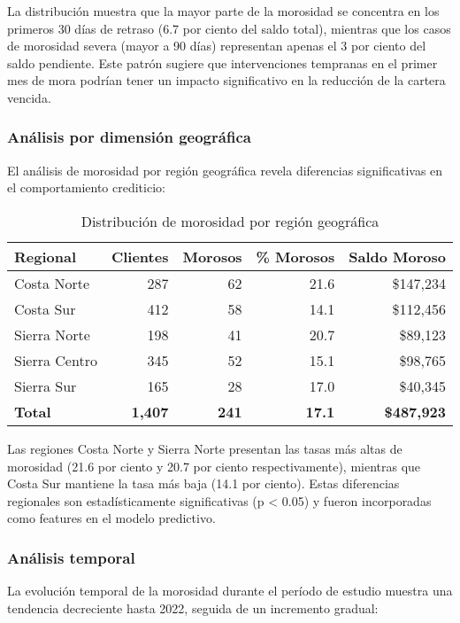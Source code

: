 La distribución muestra que la mayor parte de la morosidad se concentra en los primeros 30 días de retraso (6.7 por ciento del saldo total), mientras que los casos de morosidad severa (mayor a 90 días) representan apenas el 3 por ciento del saldo pendiente. Este patrón sugiere que intervenciones tempranas en el primer mes de mora podrían tener un impacto significativo en la reducción de la cartera vencida.

\subsubsection{Análisis por dimensión geográfica}

El análisis de morosidad por región geográfica revela diferencias significativas en el comportamiento crediticio:

\begin{table}[ht]
\centering
\begin{tabular}{|l|r|r|r|r|}
\hline
\textbf{Regional} & \textbf{Clientes} & \textbf{Morosos} & \textbf{\% Morosos} & \textbf{Saldo Moroso} \\
\hline
Costa Norte & 287 & 62 & 21.6 & \$147,234 \\
Costa Sur & 412 & 58 & 14.1 & \$112,456 \\
Sierra Norte & 198 & 41 & 20.7 & \$89,123 \\
Sierra Centro & 345 & 52 & 15.1 & \$98,765 \\
Sierra Sur & 165 & 28 & 17.0 & \$40,345 \\
\hline
\textbf{Total} & \textbf{1,407} & \textbf{241} & \textbf{17.1} & \textbf{\$487,923} \\
\hline
\end{tabular}
\caption{Distribución de morosidad por región geográfica}
\end{table}

Las regiones Costa Norte y Sierra Norte presentan las tasas más altas de morosidad (21.6 por ciento y 20.7 por ciento respectivamente), mientras que Costa Sur mantiene la tasa más baja (14.1 por ciento). Estas diferencias regionales son estadísticamente significativas (p < 0.05) y fueron incorporadas como features en el modelo predictivo.

\subsubsection{Análisis temporal}

La evolución temporal de la morosidad durante el período de estudio muestra una tendencia decreciente hasta 2022, seguida de un incremento gradual:

